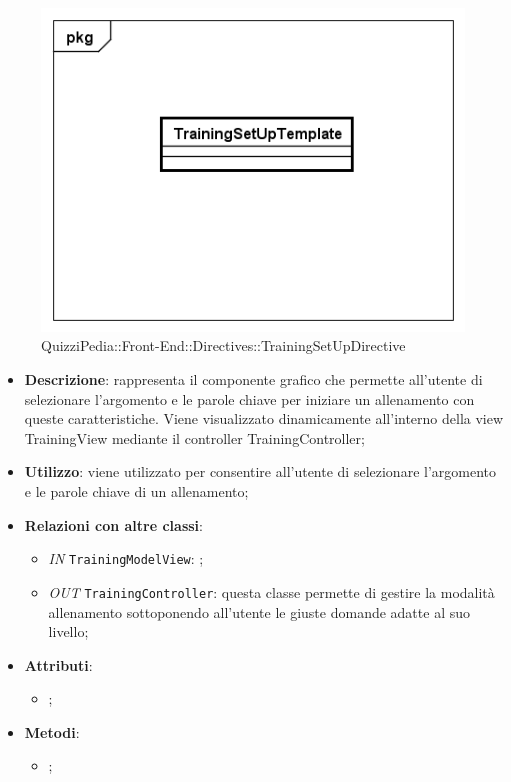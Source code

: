 		\label{QuizziPedia::Front-End::Directives::TrainingSetUpDirective}
		
		\begin{figure}[ht]
			\centering
			\includegraphics[scale=0.5,keepaspectratio]{UML/Classi/Front-End/QuizziPedia_Front-end_Templates_TrainingSetUpTemplate.png}
			\caption{QuizziPedia::Front-End::Directives::TrainingSetUpDirective}
		\end{figure} \FloatBarrier
		
		\begin{itemize}
			\item \textbf{Descrizione}: rappresenta il componente grafico che permette all'utente di selezionare l'argomento e le parole chiave per iniziare un allenamento con queste caratteristiche. Viene visualizzato dinamicamente all'interno della view TrainingView mediante il controller TrainingController;
			\item \textbf{Utilizzo}: viene utilizzato per consentire all'utente di selezionare l'argomento e le parole chiave di un allenamento;
			\item \textbf{Relazioni con altre classi}: 
			\begin{itemize}
				\item \textit{IN} \texttt{TrainingModelView}: ; 
				\item \textit{OUT} \texttt{TrainingController}: questa classe permette di gestire la modalità allenamento sottoponendo all'utente le giuste domande adatte al suo livello;
			\end{itemize}
			\item \textbf{Attributi}: 
			\begin{itemize}
				\item ;
			\end{itemize}
			\item \textbf{Metodi}: 
			\begin{itemize}
				\item ;
			\end{itemize}
		\end{itemize}
		
